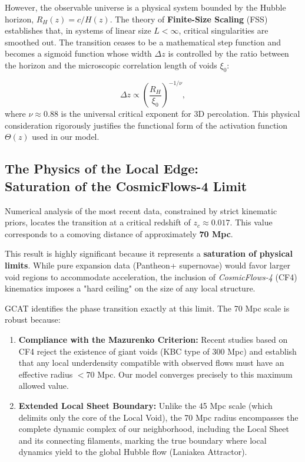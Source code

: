 \documentclass[12pt, a4paper]{article}
\theoremstyle{plain}
\theoremstyle{definition}
\begin{document}
However, the observable universe is a physical system bounded by the Hubble horizon, $R_H(z) = c/H(z)$. The theory of \textbf{Finite-Size Scaling} (FSS) establishes that, in systems of linear size $L < \infty$, critical singularities are smoothed out. The transition ceases to be a mathematical step function and becomes a sigmoid function whose width $\Delta z$ is controlled by the ratio between the horizon and the microscopic correlation length of voids $\xi_0$:

\begin{equation}
\Delta z \propto \left(\frac{R_H}{\xi_0}\right)^{-1/\nu},
\label{eq:fss_width}
\end{equation}
where $\nu \approx 0.88$ is the universal critical exponent for 3D percolation. This physical consideration rigorously justifies the functional form of the activation function $\Theta(z)$ used in our model.

\subsection[The Physics of the Local Edge: Saturation of the CosmicFlows-4 Limit]{The Physics of the Local Edge: \\ Saturation of the CosmicFlows-4 Limit}

Numerical analysis of the most recent data, constrained by strict kinematic priors, locates the transition at a critical redshift of \textbf{$z_c \approx 0.017$}. This value corresponds to a comoving distance of approximately \textbf{70 Mpc}.

This result is highly significant because it represents a \textbf{saturation of physical limits}. While pure expansion data (Pantheon+ supernovae) would favor larger void regions to accommodate acceleration, the inclusion of \textit{CosmicFlows-4} (CF4) kinematics imposes a "hard ceiling" on the size of any local structure.

GCAT identifies the phase transition exactly at this limit. The 70 Mpc scale is robust because:

\begin{enumerate}
    \item \textbf{Compliance with the Mazurenko Criterion:} Recent studies based on CF4 \cite{Mazurenko2024} reject the existence of giant voids (KBC type of 300 Mpc) and establish that any local underdensity compatible with observed flows must have an effective radius $< 70$ Mpc. Our model converges precisely to this maximum allowed value.
    
    \item \textbf{Extended Local Sheet Boundary:} Unlike the 45 Mpc scale (which delimits only the core of the Local Void), the 70 Mpc radius encompasses the complete dynamic complex of our neighborhood, including the Local Sheet and its connecting filaments, marking the true boundary where local dynamics yield to the global Hubble flow (Laniakea Attractor).
\end{enumerate}
\end{document}
